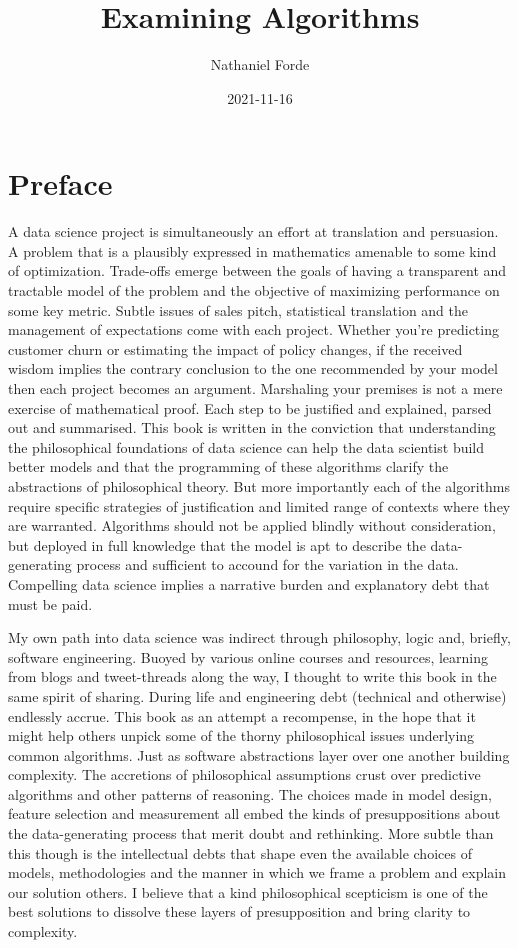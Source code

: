 \documentclass[]{tufte-book}
\title{Examining Algorithms}
\author{Nathaniel Forde}
\date{2021-11-16}
\theoremstyle{definition}
\theoremstyle{definition}
\theoremstyle{definition}
\theoremstyle{remark}
\begin{document}
\maketitle



{
\setcounter{tocdepth}{1}
\tableofcontents
}

\hypertarget{preface}{%
\chapter{Preface}\label{preface}}

A data science project is simultaneously an effort at translation and persuasion. A problem that is a plausibly expressed in mathematics amenable to some kind of optimization. Trade-offs emerge between the goals of having a transparent and tractable model of the problem and the objective of maximizing performance on some key metric. Subtle issues of sales pitch, statistical translation and the management of expectations come with each project. Whether you're predicting customer churn or estimating the impact of policy changes, if the received wisdom implies the contrary conclusion to the one recommended by your model then each project becomes an argument. Marshaling your premises is not a mere exercise of mathematical proof. Each step to be justified and explained, parsed out and summarised. This book is written in the conviction that understanding the philosophical foundations of data science can help the data scientist build better models and that the programming of these algorithms clarify the abstractions of philosophical theory. But more importantly each of the algorithms require specific strategies of justification and limited range of contexts where they are warranted. Algorithms should not be applied blindly without consideration, but deployed in full knowledge that the model is apt to describe the data-generating process and sufficient to accound for the variation in the data. Compelling data science implies a narrative burden and explanatory debt that must be paid.

My own path into data science was indirect through philosophy, logic and, briefly, software engineering. Buoyed by various online courses and resources, learning from blogs and tweet-threads along the way, I thought to write this book in the same spirit of sharing. During life and engineering debt (technical and otherwise) endlessly accrue. This book as an attempt a recompense, in the hope that it might help others unpick some of the thorny philosophical issues underlying common algorithms. Just as software abstractions layer over one another building complexity. The accretions of philosophical assumptions crust over predictive algorithms and other patterns of reasoning. The choices made in model design, feature selection and measurement all embed the kinds of presuppositions about the data-generating process that merit doubt and rethinking. More subtle than this though is the intellectual debts that shape even the available choices of models, methodologies and the manner in which we frame a problem and explain our solution others. I believe that a kind philosophical scepticism is one of the best solutions to dissolve these layers of presupposition and bring clarity to complexity.
\end{document}
